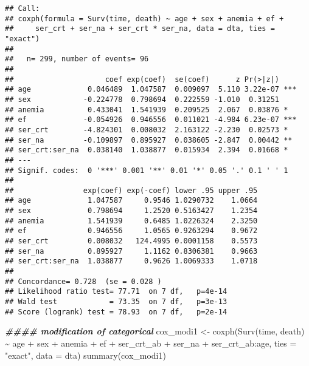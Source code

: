 \documentclass[
]{article}
\newenvironment{Shaded}{\begin{snugshade}}{\end{snugshade}}
\newcommand{\AttributeTok}[1]{\textcolor[rgb]{0.77,0.63,0.00}{#1}}
\newcommand{\DocumentationTok}[1]{\textcolor[rgb]{0.56,0.35,0.01}{\textbf{\textit{#1}}}}
\newcommand{\FunctionTok}[1]{\textcolor[rgb]{0.00,0.00,0.00}{#1}}
\newcommand{\NormalTok}[1]{#1}
\newcommand{\OtherTok}[1]{\textcolor[rgb]{0.56,0.35,0.01}{#1}}
\newcommand{\SpecialCharTok}[1]{\textcolor[rgb]{0.00,0.00,0.00}{#1}}
\newcommand{\StringTok}[1]{\textcolor[rgb]{0.31,0.60,0.02}{#1}}
\begin{document}
\begin{verbatim}
## Call:
## coxph(formula = Surv(time, death) ~ age + sex + anemia + ef + 
##     ser_crt + ser_na + ser_crt * ser_na, data = dta, ties = "exact")
## 
##   n= 299, number of events= 96 
## 
##                     coef exp(coef)  se(coef)      z Pr(>|z|)    
## age             0.046489  1.047587  0.009097  5.110 3.22e-07 ***
## sex            -0.224778  0.798694  0.222559 -1.010  0.31251    
## anemia          0.433041  1.541939  0.209525  2.067  0.03876 *  
## ef             -0.054926  0.946556  0.011021 -4.984 6.23e-07 ***
## ser_crt        -4.824301  0.008032  2.163122 -2.230  0.02573 *  
## ser_na         -0.109897  0.895927  0.038605 -2.847  0.00442 ** 
## ser_crt:ser_na  0.038140  1.038877  0.015934  2.394  0.01668 *  
## ---
## Signif. codes:  0 '***' 0.001 '**' 0.01 '*' 0.05 '.' 0.1 ' ' 1
## 
##                exp(coef) exp(-coef) lower .95 upper .95
## age             1.047587     0.9546 1.0290732    1.0664
## sex             0.798694     1.2520 0.5163427    1.2354
## anemia          1.541939     0.6485 1.0226324    2.3250
## ef              0.946556     1.0565 0.9263294    0.9672
## ser_crt         0.008032   124.4995 0.0001158    0.5573
## ser_na          0.895927     1.1162 0.8306381    0.9663
## ser_crt:ser_na  1.038877     0.9626 1.0069333    1.0718
## 
## Concordance= 0.728  (se = 0.028 )
## Likelihood ratio test= 77.71  on 7 df,   p=4e-14
## Wald test            = 73.35  on 7 df,   p=3e-13
## Score (logrank) test = 78.93  on 7 df,   p=2e-14
\end{verbatim}

\begin{Shaded}
\begin{Highlighting}[]
\DocumentationTok{\#\#\#\# modification of categorical }
\NormalTok{cox\_modi1 }\OtherTok{\textless{}{-}} \FunctionTok{coxph}\NormalTok{(}\FunctionTok{Surv}\NormalTok{(time, death) }\SpecialCharTok{\textasciitilde{}}\NormalTok{ age  }\SpecialCharTok{+}\NormalTok{ sex }\SpecialCharTok{+}\NormalTok{ anemia }\SpecialCharTok{+}\NormalTok{ ef }\SpecialCharTok{+}\NormalTok{ ser\_crt\_ab }\SpecialCharTok{+}\NormalTok{ ser\_na }\SpecialCharTok{+}\NormalTok{ ser\_crt\_ab}\SpecialCharTok{:}\NormalTok{age, }\AttributeTok{ties =} \StringTok{"exact"}\NormalTok{, }\AttributeTok{data =}\NormalTok{ dta)}
\FunctionTok{summary}\NormalTok{(cox\_modi1)}
\end{Highlighting}
\end{Shaded}
\end{document}
